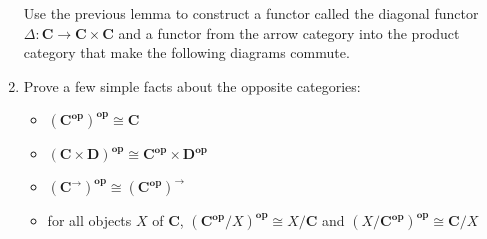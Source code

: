 \documentclass{scrartcl}
\newcommand{\Cat}[1]{\mathbf{#1}}
\newcommand{\Op}[1]{#1^{\mathbf{op}}}
\newcommand{\Arr}[1]{#1^{\rightarrow}}
\newcommand{\iso}[0]{\cong}
\begin{document}
\begin{enumerate}
  Use the previous lemma to construct a functor called the diagonal functor $\Delta: \Cat{C} \rightarrow \Cat{C} \times \Cat{C}$ and a functor from the arrow category into the product category that make the following diagrams commute.
  \begin{center}
  \end{center}
 
\item
  Prove a few simple facts about the opposite categories:
  \begin{itemize}
  \item $\Op{(\Op{\Cat{C}})} \iso \Cat{C}$
  \item $\Op{(\Cat{C} \times \Cat{D})} \iso \Op{\Cat{C}} \times \Op{\Cat{D}}$
  \item $\Op{(\Arr{\Cat{C}})} \iso \Arr{(\Op{\Cat{C}})}$
  \item for all objects $X$ of $\Cat{C}$, $\Op{(\Op{\Cat{C}}/X)} \iso X/\Cat{C}$ and $\Op{(X/\Op{\Cat{C}})} \iso \Cat{C}/X$
  \end{itemize}

\end{enumerate}

% 
% 
\end{document}
